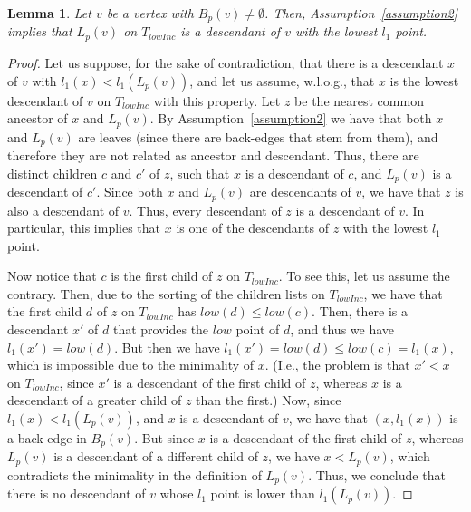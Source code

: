 \documentclass[11pt,a4paper]{article}
\newtheorem{lemma}[theorem]{Lemma}
\begin{document}
\begin{lemma}
\label{lemma:lowestl1}
Let $v$ be a vertex with $B_p(v)\neq\emptyset$. Then, Assumption~\ref{assumption2} implies that $L_p(v)$ on $T_\mathit{lowInc}$ is a descendant of $v$ with the lowest $l_1$ point.
\end{lemma}
\begin{proof}
Let us suppose, for the sake of contradiction, that there is a descendant $x$ of $v$ with $l_1(x)<l_1(L_p(v))$, and let us assume, w.l.o.g., that $x$ is the lowest descendant of $v$ on $T_\mathit{lowInc}$ with this property. Let $z$ be the nearest common ancestor of $x$ and $L_p(v)$. By Assumption~\ref{assumption2} we have that both $x$ and $L_p(v)$ are leaves (since there are back-edges that stem from them), and therefore they are not related as ancestor and descendant. Thus, there are distinct children $c$ and $c'$ of $z$, such that $x$ is a descendant of $c$, and $L_p(v)$ is a descendant of $c'$. Since both $x$ and $L_p(v)$ are descendants of $v$, we have that $z$ is also a descendant of $v$. Thus, every descendant of $z$ is a descendant of $v$. In particular, this implies that $x$ is one of the descendants of $z$ with the lowest $l_1$ point.

Now notice that $c$ is the first child of $z$ on $T_\mathit{lowInc}$. To see this, let us assume the contrary. Then, due to the sorting of the children lists on $T_\mathit{lowInc}$, we have that the first child $d$ of $z$ on $T_\mathit{lowInc}$ has $\mathit{low}(d)\leq\mathit{low}(c)$. Then, there is a descendant $x'$ of $d$ that provides the $\mathit{low}$ point of $d$, and thus we have $l_1(x')=\mathit{low}(d)$. But then we have $l_1(x')=\mathit{low}(d)\leq\mathit{low}(c)=l_1(x)$, which is impossible due to the minimality of $x$. (I.e., the problem is that $x'<x$ on $T_\mathit{lowInc}$, since $x'$ is a descendant of the first child of $z$, whereas $x$ is a descendant of a greater child of $z$ than the first.) Now, since $l_1(x)<l_1(L_p(v))$, and $x$ is a descendant of $v$, we have that $(x,l_1(x))$ is a back-edge in $B_p(v)$. But since $x$ is a descendant of the first child of $z$, whereas $L_p(v)$ is a descendant of a different child of $z$, we have $x<L_p(v)$, which contradicts the minimality in the definition of $L_p(v)$. Thus, we conclude that there is no descendant of $v$ whose $l_1$ point is lower than $l_1(L_p(v))$. 
\end{proof}
\end{document}
